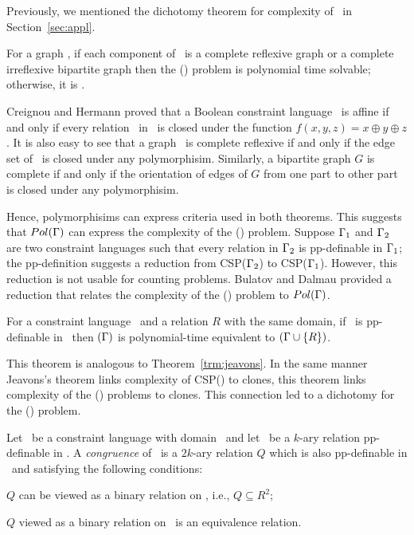 Previously, we mentioned the dichotomy theorem for complexity of \ccsp\ in  Section~\ref{sec:appl}.

\begin{theorem} 
For a graph \mH, if each component of \mH\ is a complete reflexive graph
or a complete irreflexive bipartite graph then the \chom(\mH) problem 
is polynomial time solvable; otherwise, it is \cpc\@.
\end{theorem}

Creignou and Hermann \cite{Nadia} proved that a Boolean constraint language \mrelset\
is affine if and only if every relation \mR\ in \mrelset\
is closed under the function \(f(x,y,z)=x\oplus y \oplus z\). It is also easy to see that
a graph \mG\ is complete reflexive if and only if the edge set of \mG\ is closed under any
polymorphisim. Similarly, a bipartite graph \(G\) is complete if and only if the orientation of edges
of \(G\) from one part to other part is closed under any polymorphisim.

Hence, polymorphisims can express criteria used in both theorems. This suggests
that \(Pol(\Gamma)\) can express the complexity of the \ccsp(\mrelset) problem.
Suppose \(\Gamma_1\) and \(\Gamma_2\) are two constraint languages such that
every relation in \(\Gamma_2\) is pp-definable in \(\Gamma_1\); 
the pp-definition suggests a reduction from CSP(\(\Gamma_2\))
to CSP(\(\Gamma_1\))\@. However, this reduction is not usable for counting problems. 
Bulatov and Dalmau provided a reduction that relates 
the complexity of the \ccsp(\mrelset) problem to \(Pol(\Gamma)\)\@.

\begin{theorem} 
For a constraint language \mrelset\ and a relation \(R\) with the same domain,
if \mR\ is pp-definable in \mrelset\ then \ccsp\((\Gamma)\) is polynomial-time equivalent 
to \ccsp\((\Gamma \cup \{{R}\})\)\@.
\end{theorem}

This theorem is analogous to Theorem~\ref{trm:jeavons}. In the same manner Jeavons's theorem
links complexity of CSP(\mrelset) to clones, this theorem
links complexity of the \ccsp(\mrelset) problems to clones. This connection
led to a dichotomy for the \ccsp(\mrelset) problem.

Let \mrelset\ be a constraint language with domain \mD\ and 
let \mR\ be a \(k\)-ary relation pp-definable in \mrelset\@.
A \emph{congruence} of \mR\ is a \(2k\)-ary relation \(Q\) which is also pp-definable in \mrelset\
and satisfying the following conditions:
\begin{inparaenum}[(a)]
\item \(Q\) can be viewed as a binary relation on \mR, i.e., \(Q \subseteq R^2\);
\item \(Q\) viewed as a binary relation on \mR\ is an equivalence relation.
\end{inparaenum}


